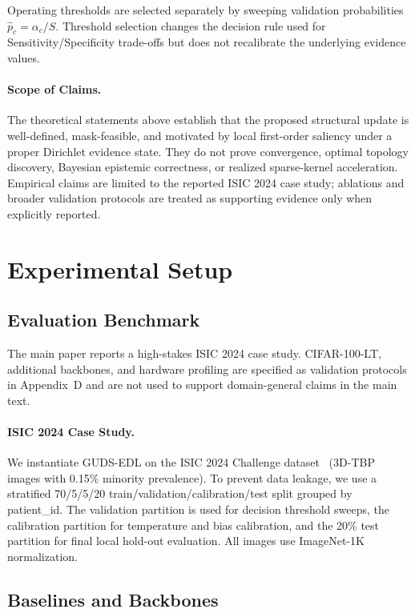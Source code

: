\documentclass[letterpaper]{article} %
\begin{document}
Operating thresholds are selected separately by sweeping validation probabilities $\hat p_c=\alpha_c/S$. Threshold selection changes the decision rule used for Sensitivity/Specificity trade-offs but does not recalibrate the underlying evidence values.

\paragraph{Scope of Claims.}
The theoretical statements above establish that the proposed structural update is well-defined, mask-feasible, and motivated by local first-order saliency under a proper Dirichlet evidence state. They do not prove convergence, optimal topology discovery, Bayesian epistemic correctness, or realized sparse-kernel acceleration. Empirical claims are limited to the reported ISIC 2024 case study; ablations and broader validation protocols are treated as supporting evidence only when explicitly reported.

\section{Experimental Setup}\label{sec:experiment}

\subsection{Evaluation Benchmark}
The main paper reports a high-stakes ISIC 2024 case study. CIFAR-100-LT, additional backbones, and hardware profiling are specified as validation protocols in Appendix~D and are not used to support domain-general claims in the main text.

\paragraph{ISIC 2024 Case Study.} We instantiate GUDS-EDL on the ISIC 2024 Challenge dataset~\cite{isic2024} (3D-TBP images with 0.15\% minority prevalence). To prevent data leakage, we use a stratified 70/5/5/20 train/validation/calibration/test split grouped by patient\_id. The validation partition is used for decision threshold sweeps, the calibration partition for temperature and bias calibration, and the 20\% test partition for final local hold-out evaluation. All images use ImageNet-1K normalization.

\subsection{Baselines and Backbones}
\end{document}
